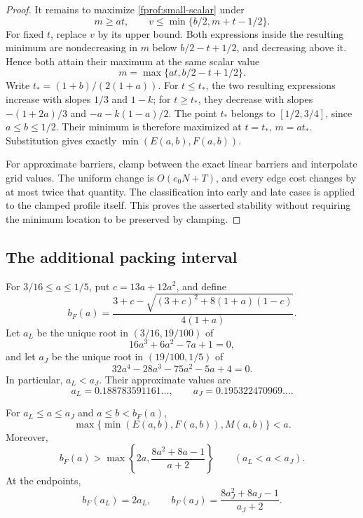 \begin{proof}
It remains to maximize \eqref{fprof:small-scalar} under
$$
 m\ge at,\qquad v\le\min\{b/2,m+t-1/2\}.
$$
For fixed \(t\), replace \(v\) by its upper bound. Both expressions
inside the resulting minimum are nondecreasing in \(m\) below
\(b/2-t+1/2\), and decreasing above it. Hence both attain their maximum
at the same scalar value
$$
 m=\max\{at,b/2-t+1/2\}.
$$
Write \(t_*=(1+b)/(2(1+a))\). For \(t\le t_*\), the two resulting
expressions increase with slopes \(1/3\) and \(1-k\); for
\(t\ge t_*\), they decrease with slopes
\(-(1+2a)/3\) and \(-a-k(1-a)/2\). The point \(t_*\) belongs to
\([1/2,3/4]\), since \(a\le b\le1/2\). Their minimum is therefore
maximized at \(t=t_*\), \(m=at_*\). Substitution gives exactly
\(\min(E(a,b),F(a,b))\).

For approximate barriers, clamp between the exact linear barriers and
interpolate grid values. The uniform change is \(O(e_0N+T)\), and every
edge cost changes by at most twice that quantity. The classification into
early and late cases is applied to the clamped profile itself. This proves
the asserted stability without requiring the minimum location to be
preserved by clamping.
\end{proof}

\subsection{The additional packing interval}

For \(3/16\le a\le1/5\), put \(c=13a+12a^2\), and define
\begin{equation}\label{fprof:small-bF}
 b_F(a)=\frac{3+c-\sqrt{(3+c)^2+8(1+a)(1-c)}}{4(1+a)}.
\end{equation}
Let \(a_L\) be the unique root in \((3/16,19/100)\) of
$$
 16a^3+6a^2-7a+1=0,
$$
and let \(a_J\) be the unique root in \((19/100,1/5)\) of
$$
 32a^4-28a^3-75a^2-5a+4=0.
$$
In particular, \(a_L<a_J\). Their approximate values are
$$
 a_L=0.188783591161\ldots,\qquad
 a_J=0.195322470969\ldots.
$$

\begin{proposition}\label{fprof:small-balance}
For \(a_L\le a\le a_J\) and \(a\le b<b_F(a)\),
$$
 \max\{\min(E(a,b),F(a,b)),M(a,b)\}<a.
$$
Moreover,
$$
 b_F(a)>\max\left\{2a,\frac{8a^2+8a-1}{a+2}\right\}
 \qquad(a_L<a<a_J).
$$
At the endpoints,
$$
 b_F(a_L)=2a_L,\qquad
 b_F(a_J)=\frac{8a_J^2+8a_J-1}{a_J+2}.
$$
\end{proposition}

